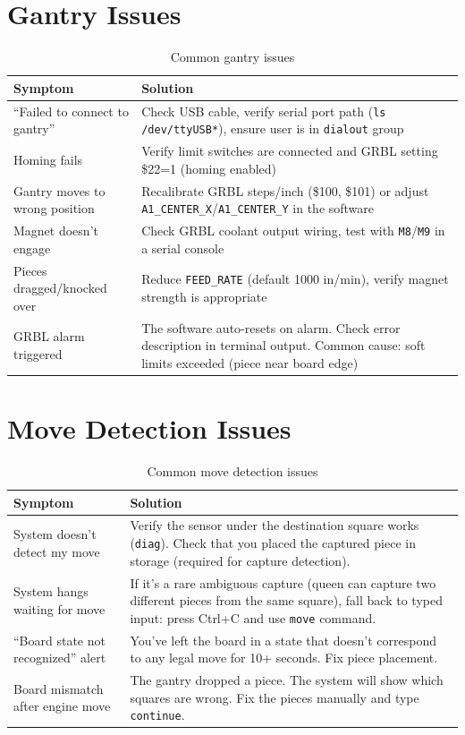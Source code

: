 \documentclass[11pt,a4paper]{report}
\begin{document}
\section{Gantry Issues}

\begin{table}[H]
\centering
\begin{tabular}{p{5cm}p{9cm}}
\toprule
\textbf{Symptom} & \textbf{Solution} \\
\midrule
``Failed to connect to gantry'' & Check USB cable, verify serial port path (\texttt{ls /dev/ttyUSB*}), ensure user is in \texttt{dialout} group \\
\addlinespace
Homing fails & Verify limit switches are connected and GRBL setting \$22=1 (homing enabled) \\
\addlinespace
Gantry moves to wrong position & Recalibrate GRBL steps/inch (\$100, \$101) or adjust \texttt{A1\_CENTER\_X}/\texttt{A1\_CENTER\_Y} in the software \\
\addlinespace
Magnet doesn't engage & Check GRBL coolant output wiring, test with \texttt{M8}/\texttt{M9} in a serial console \\
\addlinespace
Pieces dragged/knocked over & Reduce \texttt{FEED\_RATE} (default 1000 in/min), verify magnet strength is appropriate \\
\addlinespace
GRBL alarm triggered & The software auto-resets on alarm. Check error description in terminal output. Common cause: soft limits exceeded (piece near board edge) \\
\bottomrule
\end{tabular}
\caption{Common gantry issues}
\end{table}

\section{Move Detection Issues}

\begin{table}[H]
\centering
\begin{tabular}{p{5cm}p{9cm}}
\toprule
\textbf{Symptom} & \textbf{Solution} \\
\midrule
System doesn't detect my move & Verify the sensor under the destination square works (\texttt{diag}). Check that you placed the captured piece in storage (required for capture detection). \\
\addlinespace
System hangs waiting for move & If it's a rare ambiguous capture (queen can capture two different pieces from the same square), fall back to typed input: press Ctrl+C and use \texttt{move} command. \\
\addlinespace
``Board state not recognized'' alert & You've left the board in a state that doesn't correspond to any legal move for 10+ seconds. Fix piece placement. \\
\addlinespace
Board mismatch after engine move & The gantry dropped a piece. The system will show which squares are wrong. Fix the pieces manually and type \texttt{continue}. \\
\bottomrule
\end{tabular}
\caption{Common move detection issues}
\end{table}
\end{document}
